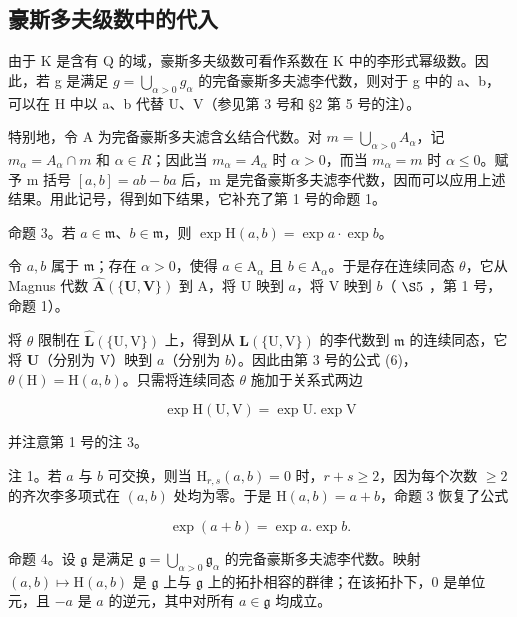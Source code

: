 \subsection{豪斯多夫级数中的代入}

由于 K 是含有 Q 的域，豪斯多夫级数可看作系数在 K 中的李形式幂级数。因此，若 g 是满足 \(g = \bigcup_{\alpha > 0} g_{\alpha}\) 的完备豪斯多夫滤李代数，则对于 g 中的 a、b，可以在 H 中以 a、b 代替 U、V（参见第 3 号和 §2 第 5 号的注）。

特别地，令 A 为完备豪斯多夫滤含幺结合代数。对 \(m = \bigcup_{\alpha > 0} A_{\alpha}\)，记 \(m_{\alpha} = A_{\alpha} \cap m\) 和 \(\alpha \in R\)；因此当 \(m_{\alpha} = A_{\alpha}\) 时 \(\alpha > 0\)，而当 \(m_{\alpha} = m\) 时 \(\alpha \leqslant 0\)。赋予 m 括号 \([a, b] = ab - ba\) 后，m 是完备豪斯多夫滤李代数，因而可以应用上述结果。用此记号，得到如下结果，它补充了第 1 号的命题 1。

命题 3。若 \(a \in \mathfrak{m}\)、\(b \in \mathfrak{m}\)，则 \(\exp \mathrm{H}(a, b) = \exp a \cdot \exp b\)。

令 \(a, b\) 属于 \(\mathfrak{m}\)；存在 \(\alpha > 0\)，使得 \(a \in \mathrm{A}_{\alpha}\) 且 \(b \in \mathrm{A}_{\alpha}\)。于是存在连续同态 \(\theta\)，它从 Magnus 代数 \(\hat{\mathbf{A}}(\{\mathbf{U},\mathbf{V}\})\) 到 A，将 U 映到 \(a\)，将 V 映到 \(b\)（ \(\S 5\) ，第 1 号，命题 1）。

将 \(\theta\) 限制在 \(\hat{\mathbf{L}}(\{\mathrm{U},\mathrm{V}\})\) 上，得到从 \(\mathbf{L}(\{\mathrm{U},\mathrm{V}\})\) 的李代数到 \(\mathfrak{m}\) 的连续同态，它将 \(\mathbf{U}\)（分别为 V）映到 \(a\)（分别为 \(b\)）。因此由第 3 号的公式 (6)，\(\theta (\mathrm{H}) = \mathrm{H}(a,b)\)。只需将连续同态 \(\theta\) 施加于关系式两边

\[
\exp \mathrm{H} (\mathrm{U}, \mathrm{V}) = \exp \mathrm{U}. \exp \mathrm{V}
\]

并注意第 1 号的注 3。

注 1。若 \(a\) 与 \(b\) 可交换，则当 \(\mathrm{H}_{r,s}(a,b) = 0\) 时，\(r + s \geqslant 2\)，因为每个次数 \(\geqslant 2\) 的齐次李多项式在 \((a,b)\) 处均为零。于是 \(\mathrm{H}(a,b) = a + b\)，命题 3 恢复了公式

\[
\exp (a + b) = \exp a. \exp b.
\]

命题 4。设 \(\mathfrak{g}\) 是满足 \(\mathfrak{g} = \bigcup_{\alpha >0} \mathfrak{g}_{\alpha}\) 的完备豪斯多夫滤李代数。映射 \((a, b) \mapsto \mathrm{H}(a, b)\) 是 \(\mathfrak{g}\) 上与 \(\mathfrak{g}\) 上的拓扑相容的群律；在该拓扑下，\(0\) 是单位元，且 \(-a\) 是 \(a\) 的逆元，其中对所有 \(a \in \mathfrak{g}\) 均成立。

